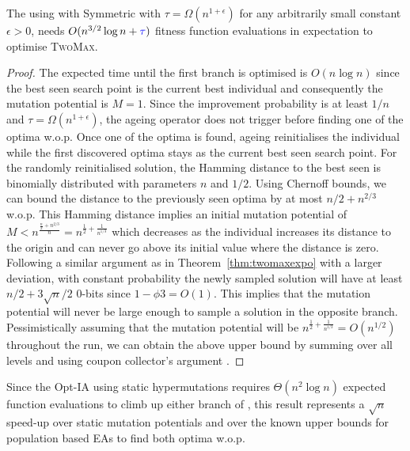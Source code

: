 \documentclass[lettersize,journal]{IEEEtran}
\begin{document}
\begin{theorem} \label{th:MexpoTwoMax}
The {\oneoneOPTIA } using \IPHfcm{} with Symmetric {\expoHD } with $\tau=\Omega(n^{1+\epsilon})$ for any 
arbitrarily small constant $\epsilon>0$, needs
$O(n^{3/2}\log{n} + {\color{blue}\tau})$ fitness function evaluations in expectation to optimise \textsc{TwoMax}.
\end{theorem}
\begin{proof}
The expected time until the first branch is optimised is $O(n\log{n})$ 
since the best seen search point is the current best individual and 
consequently the mutation potential is $M=1$. Since the improvement 
probability is at least $1/n$ and $\tau=\Omega(n^{1+\epsilon})$, the ageing 
operator does not trigger before finding one of the optima w.o.p. Once one of the optima is found, ageing reinitialises the 
individual while the first discovered optima stays as the current best seen 
search point. For the randomly reinitialised solution, the Hamming distance to 
the best seen is binomially distributed with parameters $n$ and $1/2$. Using 
Chernoff bounds, we can bound the distance to the previously seen 
optima by at most $n/2 + n^{2/3}$ w.o.p. This 
Hamming distance implies an initial mutation potential of $M< 
n^{\frac{\frac{n}{2}+n^{2/3}}{n}}=n^{\frac{1}{2}+\frac{1}{n^{1/3}}}$ which 
decreases as the individual increases its distance to the origin and can never 
go above its initial value where the distance is zero. {\color{blue} Following a similar argument as in Theorem~\ref{thm:twomaxexpo} with a larger deviation, with constant probability the newly sampled solution will have at least $n/2 + 3\sqrt{n}/2$ $0$-bits since $1-\phi{3} = O(1)$. This implies that the mutation potential will never be large enough to sample a solution in the opposite branch.}
Pessimistically assuming that the mutation potential will be 
$n^{\frac{1}{2}+\frac{1}{n^{1/3}}}=O(n^{1/2})$ throughout the run, we can obtain 
the above upper bound by summing over all levels and using coupon collector's 
argument \cite{OlivetoBookChapter}.
\end{proof}

Since the Opt-IA using static hypermutations requires $\Theta( n^2 \log n)$ expected function evaluations
to climb up either branch of \twomax{}  \cite{CorusOlivetoYazdani2019TCS}, this result represents a $\sqrt{n}$ speed-up
over static mutation potentials and over the known upper bounds for population based EAs to find both optima w.o.p.
\end{document}
